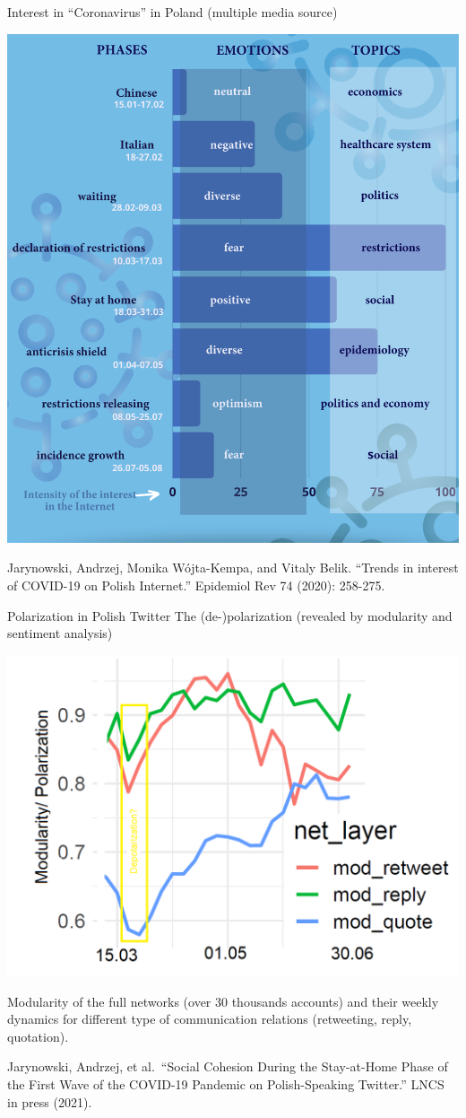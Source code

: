 \documentclass[
  10pt,
  ignorenonframetext,
  a4paper,handout]{beamer}
\begin{document}
\begin{frame}{Interest in ``Coronavirus'' in Poland (multiple media
source)}
\protect\hypertarget{interest-in-coronavirus-in-poland-multiple-media-source}{}
\begin{center}\includegraphics[width=0.5\linewidth]{phases} \end{center}

Jarynowski, Andrzej, Monika Wójta-Kempa, and Vitaly Belik. ``Trends in
interest of COVID-19 on Polish Internet.'' Epidemiol Rev 74 (2020):
258-275.
\end{frame}

\begin{frame}{Polarization in Polish Twitter}
\protect\hypertarget{polarization-in-polish-twitter}{}
The (de-)polarization (revealed by modularity and sentiment analysis)

\begin{center}\includegraphics[width=0.5\linewidth]{polaryzacja} \end{center}

Modularity of the full networks (over 30 thousands accounts) and their
weekly dynamics for different type of communication relations
(retweeting, reply, quotation).

Jarynowski, Andrzej, et al.~``Social Cohesion During the Stay-at-Home
Phase of the First Wave of the COVID-19 Pandemic on Polish-Speaking
Twitter.'' LNCS in press (2021).
\end{frame}
\end{document}
